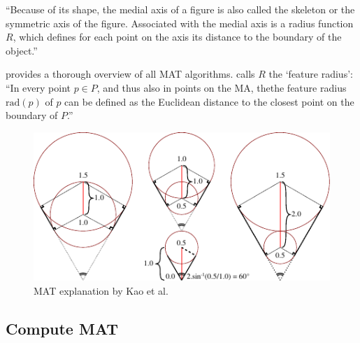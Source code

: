 ``Because of its shape, the medial axis of a figure is also called the skeleton or the symmetric axis of the figure.
Associated with the medial axis is a radius function $R$, which defines for each point on the axis its distance to the boundary of the object.''
\cite{lee1982medial}

\cite{Moesen2011} provides a thorough overview of all MAT algorithms.
\cite{Moesen2011} calls $R$ the `feature radius': ``In every point $p \in P$, and thus also in points on the MA, thethe feature radius $\text{rad}(p)$ of $p$ can be defined as the Euclidean distance to the closest point on the boundary of $P$.''

\cite{kao1998optimal}
\begin{figure}[H]
\centering
\includegraphics[width=.9\columnwidth]{sources/method/distance_based_angles.pdf}
\caption{MAT explanation by Kao et al.}
\end{figure}

\subsection{Compute MAT}

